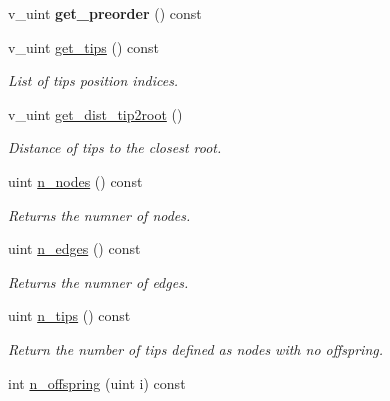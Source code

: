 \begin{DoxyCompactItemize}
v\+\_\+uint {\bfseries get\+\_\+preorder} () const
\item 
\mbox{\label{classTree_a411811df044855ec7266ba16331880dd}} 
v\+\_\+uint \hyperlink{classTree_a411811df044855ec7266ba16331880dd}{get\+\_\+tips} () const
\begin{DoxyCompactList}\small\item\em List of tips position indices. \end{DoxyCompactList}\item 
\mbox{\label{classTree_a506eec876c7817e3a83f9cf1bf8090cc}} 
v\+\_\+uint \hyperlink{classTree_a506eec876c7817e3a83f9cf1bf8090cc}{get\+\_\+dist\+\_\+tip2root} ()
\begin{DoxyCompactList}\small\item\em Distance of tips to the closest root. \end{DoxyCompactList}\item 
\mbox{\label{classTree_a56f6eba2fc5df2bc20cbf2555d26dae8}} 
uint \hyperlink{classTree_a56f6eba2fc5df2bc20cbf2555d26dae8}{n\+\_\+nodes} () const
\begin{DoxyCompactList}\small\item\em Returns the numner of nodes. \end{DoxyCompactList}\item 
\mbox{\label{classTree_aec93ed515e663b13160bb1761da38751}} 
uint \hyperlink{classTree_aec93ed515e663b13160bb1761da38751}{n\+\_\+edges} () const
\begin{DoxyCompactList}\small\item\em Returns the numner of edges. \end{DoxyCompactList}\item 
\mbox{\label{classTree_a8ac445babc8822e53144d5a4051f931b}} 
uint \hyperlink{classTree_a8ac445babc8822e53144d5a4051f931b}{n\+\_\+tips} () const
\begin{DoxyCompactList}\small\item\em Return the number of tips defined as nodes with no offspring. \end{DoxyCompactList}\item 
\mbox{\label{classTree_a66351f434b1a92e9121ced0535b024a2}} 
int \hyperlink{classTree_a66351f434b1a92e9121ced0535b024a2}{n\+\_\+offspring} (uint i) const

\end{DoxyCompactItemize}
